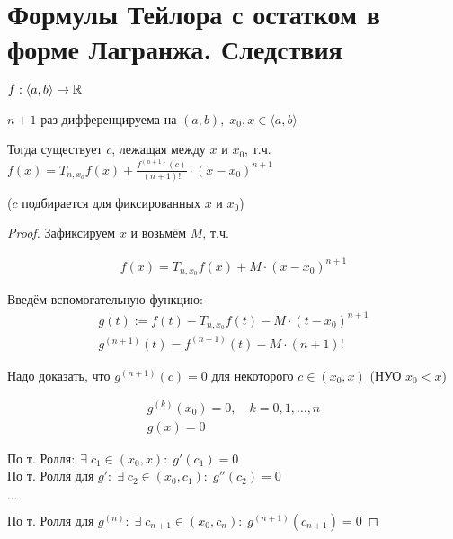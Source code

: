 
\section{Формулы Тейлора с остатком в форме Лагранжа. Следствия \href{https://youtu.be/au9-34CerJM?t=5698}{\Walley}}

\begin{theorem-non}
    $f: \langle a, b \rangle \rightarrow \mathbb{R}$

    $n + 1$ раз дифференцируема на $(a, b), \; x_0, x \in 
    \langle a, b \rangle$

    Тогда существует $c$, лежащая между $x$ и $x_0$, т.ч.
    $f(x) = T_{n,x_o} f(x) + \frac{f^{(n+1)}(c)}{(n+1)!} \cdot (x - x_0)^{n+1}$

    ($c$ подбирается для фиксированных $x$ и $x_0$)

    \begin{proof}
        Зафиксируем $x$ и возьмём $M$, т.ч.
        
        \begin{gather*}
            f(x) = T_{n,x_0} f(x) + M \cdot (x - x_0)^{n+1}
        \end{gather*}

        Введём вспомогательную функцию:
        \begin{gather*}
            g(t) := f(t) - T_{n, x_0}f(t) - M \cdot (t - x_0)^{n+1} \\
            g^{(n+1)}(t) = f^{(n+1)}(t) - M \cdot (n + 1)!
        \end{gather*}
        
        Надо доказать, что $g^{(n+1)}(c) = 0$ для некоторого $c \in (x_0, x)$ (НУО $x_0 < x$)

        \begin{gather*}
            g^{(k)}(x_0) = 0, \quad k = 0,1, \dots, n \\
            g(x) = 0
        \end{gather*}
        
        По т. Ролля$: \; \exists \; c_1 \in (x_0, x): \; g'(c_1) = 0$ \\
        По т. Ролля для $g': \; \exists \; c_2 \in (x_0, c_1): \; g''(c_2) = 0$

        $\dots$

        По т. Ролля для $g^{(n)}: \; \exists \; c_{n+1} \in (x_0, c_n): \; g^{(n+1)}(c_{n+1}) = 0$

    \end{proof}

\end{theorem-non}

